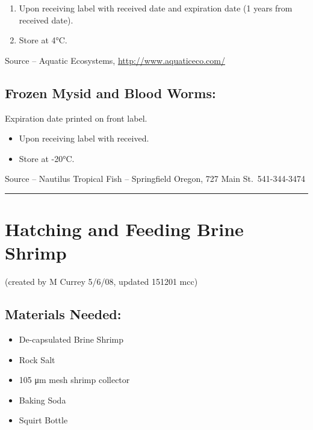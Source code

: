 \documentclass[
]{book}
\providecommand{\tightlist}{%
  \setlength{\itemsep}{0pt}\setlength{\parskip}{0pt}}
\begin{document}
\begin{enumerate}
\def\labelenumi{\arabic{enumi}.}
\tightlist
\item
  Upon receiving label with received date and expiration date (1 years from received date).
\item
  Store at 4°C.
\end{enumerate}

Source -- Aquatic Ecosystems, \url{http://www.aquaticeco.com/}

\hypertarget{frozen-mysid-and-blood-worms}{%
\subsection{Frozen Mysid and Blood Worms:}\label{frozen-mysid-and-blood-worms}}

Expiration date printed on front label.

\begin{itemize}
\tightlist
\item
  Upon receiving label with received.
\item
  Store at -20°C.
\end{itemize}

Source -- Nautilus Tropical Fish -- Springfield Oregon, 727 Main St.~541-344-3474

\begin{center}\rule{0.5\linewidth}{0.5pt}\end{center}

\hypertarget{hatching-and-feeding-brine-shrimp}{%
\section{Hatching and Feeding Brine Shrimp}\label{hatching-and-feeding-brine-shrimp}}

(created by M Currey 5/6/08, updated 151201 mcc)

\hypertarget{materials-needed}{%
\subsection{Materials Needed:}\label{materials-needed}}

\begin{itemize}
\tightlist
\item
  De-capsulated Brine Shrimp
\item
  Rock Salt
\item
  105 μm mesh shrimp collector
\item
  Baking Soda
\item
  Squirt Bottle
\end{itemize}
\end{document}
